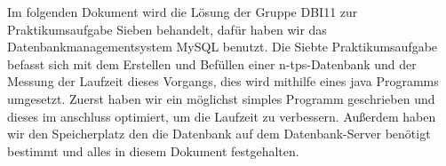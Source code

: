 Im folgenden Dokument wird die Lösung der Gruppe DBI11 zur Praktikumsaufgabe Sieben behandelt, dafür haben wir das Datenbankmanagementsystem MySQL benutzt.
Die Siebte Praktikumsaufgabe befasst sich mit dem Erstellen und Befüllen einer n-tps-Datenbank und der Messung der Laufzeit dieses Vorgangs, dies wird mithilfe eines java Programms umgesetzt.
Zuerst haben wir ein möglichst simples Programm geschrieben und dieses im anschluss optimiert, um die Laufzeit zu verbessern.
Außerdem haben wir den Speicherplatz den die Datenbank auf dem Datenbank-Server benötigt bestimmt und alles in diesem Dokument festgehalten.